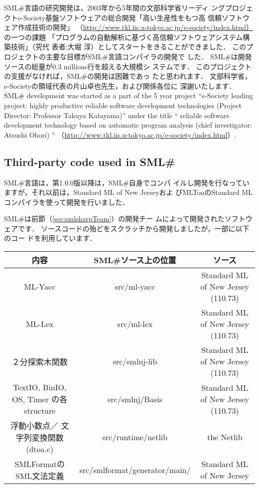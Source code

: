 \documentclass{jbook}
\newcommand{\txt}[2]{#2}
\newcommand{\smlsharp}{SML\#}
\newcommand{\version}{1.0.0}
\newcommand{\smlsharpSize}{\txt{30万}{0.3 millions}}
\begin{document}
\ifx\jp%
	\smlsharp{}言語の研究開発は，2003年から5年間の文部科学省リーディ
ングプロジェクトe-Society基盤ソフトウェアの総合開発「高い生産性をもつ高
信頼ソフトウェア作成技術の開発」
（\url{http://www.tkl.iis.u-tokyo.ac.jp/e-society/index.html）}
の一つの課題
「プログラムの自動解析に基づく高信頼ソフトウェアシステム構築技術」（究代
表者:大堀 淳）としてスタートをきることができました．
	このプロジェクトの主要な目標が\smlsharp{}言語コンパイラの開発で
した．
	\smlsharp{}は開発ソースの総量が\smlsharpSize{}行を超える大規模シ
ステムです．
	このプロジェクトの支援がなければ，\smlsharp{}の開発は困難であっ
たと思われます．
	文部科学省，e-Societyの領域代表の片山卓也先生，および関係各位に
深謝いたします．
\else%
	\smlsharp{} development was started as a part of the 5 year
project 
``e-Society leading project: highly productive reliable software
development technologies (Project Director: Professor Takuya Katayama)'' 
under the title
``
reliable software development technology based on automatic program analysis
(chief investigator: Atsushi Ohori)
''
（\url{http://www.tkl.iis.u-tokyo.ac.jp/e-society/index.html}）.
\fi%


\subsection{
\txt{\smlsharp{}が使用しているソフトウエア}
    {Third-party code used in \smlsharp{}}
}

\ifx\jp%
	\smlsharp{}言語は，第\version{}版以降は，\smlsharp{}自身でコンパ
イルし開発を行なっていますが，それ以前は，Standard ML of New Jerseyおよ
びMLTonのStandard MLコンパイラを使って開発を行いました．

	\smlsharp{}は前節（\ref{sec:smlsharpTeam}）の開発チー
ムによって開発されたソフトウェアです．
	ソースコードの殆どをスクラッチから開発しましたが，一部に以下のコー
ドを利用しています．

\begin{center}
\begin{tabular}{|c|c|c|}
\hline
内容 & \smlsharp{}ソース上の位置 & ソース
\\\hline
ML-Yacc & src/ml-yacc  & Standard ML of New Jersey (110.73)
\\\hline
ML-Lex & src/ml-lex  & Standard ML of New Jersey (110.73)
\\\hline
２分探索木関数 & src/smlnj-lib &  Standard ML of New Jersey (110.73)
\\\hline
TextIO,
BinIO,
OS,
Timer
の各structure
&
src/smlnj/Basis
&
Standard ML of New Jersey (110.73)
\\\hline
浮動小数点／
文字列変換関数
(dtoa.c)
&
src/runtime/netlib
&
the Netlib
\\\hline
SMLFormatの
SML文法定義
&
src/smlformat/generator/main/
&
Standard ML of New Jersey
\\\hline
\end{tabular}
\end{center}
\end{document}
